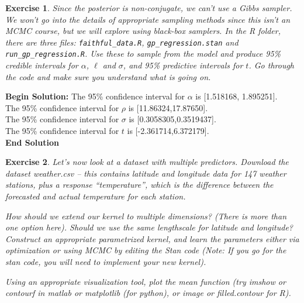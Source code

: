 \documentclass[twoside]{article}
\newcounter{lecnum}
\newtheorem{exercise}{Exercise}[lecnum]
\begin{document}
 \begin{exercise}
   Since the posterior is non-conjugate, we can't use a Gibbs sampler. We won't go into the details of appropriate sampling methods since this isn't an MCMC course, but we will explore using black-box samplers. In the R folder, there are three files: \texttt{faithful\_data.R}, \texttt{gp\_regression.stan} and \texttt{run\_gp\_regression.R}. Use these to sample from the model and produce 95\% credible intervals for $\alpha$, $\ell$ and $\sigma$, and 95\% predictive intervals for $t$. Go through the code and make sure you understand what is going on.

 \end{exercise}

\textbf{Begin Solution:}
The 95\% confidence interval for $\alpha$ is [1.518168, 1.895251].\\
The 95\% confidence interval for $\rho$ is [11.86324,17.87650].\\
The 95\% confidence interval for $\sigma$ is [0.3058305,0.3519437].\\
The 95\% confidence interval for $t$ is [-2.361714,6.372179].\\
\textbf{End Solution}

 \begin{exercise}
   Let's now look at a dataset with multiple predictors. Download the dataset weather.csv -- this contains latitude and longitude data for 147 weather stations, plus a response ``temperature'', which is the difference between the forecasted and actual temperature for each station.

   How should we extend our kernel to multiple dimensions? (There is more than one option here). Should we use the same lengthscale for latitude and longitude?  Construct an appropriate parametrized kernel, and learn the parameters either via optimization or using MCMC by editing the Stan code (Note: If you go for the stan code, you will need to implement your new kernel).

   Using an appropriate visualization tool, plot the mean function (try imshow or contourf in matlab or matplotlib (for python), or image or filled.contour for R).
 \end{exercise}
\end{document}
